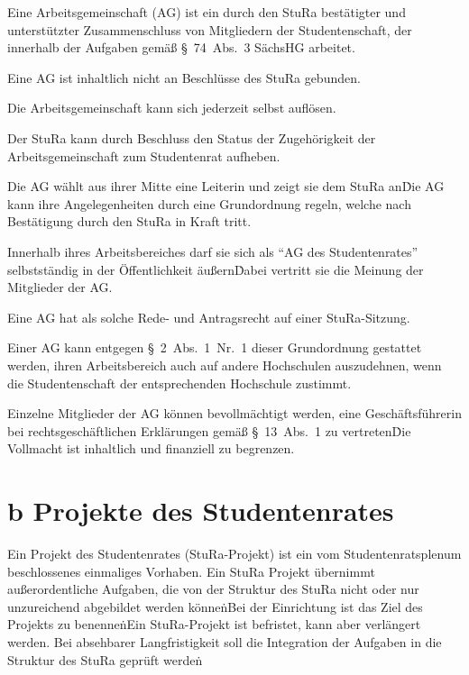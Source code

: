 \begin{multicols}{2}
\Abs \Satz Eine Arbeitsgemeinschaft (AG) ist ein durch den StuRa bestätigter und unterstützter Zusammenschluss von Mitgliedern der Studentenschaft, der innerhalb der Aufgaben gemäß §~74~Abs.~3 SächsHG arbeitet.

\Abs \Satz Eine AG ist inhaltlich nicht an Beschlüsse des StuRa gebunden.

\Abs \Satz Die Arbeitsgemeinschaft kann sich jederzeit selbst auflösen.

\Abs \Satz Der StuRa kann durch Beschluss den Status der Zugehörigkeit der Arbeitsgemeinschaft zum Studentenrat aufheben.

\Abs \Satz Die AG wählt aus ihrer Mitte eine Leiterin und zeigt sie dem StuRa an\. Die AG kann ihre Angelegenheiten durch eine Grundordnung regeln, welche nach Bestätigung durch den StuRa in Kraft tritt.

\Abs \Satz Innerhalb ihres Arbeitsbereiches darf sie sich als "`AG des Studentenrates"' selbstständig in der Öffentlichkeit äußern\. Dabei vertritt sie die Meinung der Mitglieder der AG.

\Abs \Satz Eine AG hat als solche Rede- und Antragsrecht auf einer StuRa-Sitzung.

\Abs \Satz Einer AG kann entgegen §~2~Abs.~1~Nr.~1 dieser Grundordnung gestattet werden, ihren Arbeitsbereich auch auf andere Hochschulen auszudehnen, wenn die Studentenschaft der entsprechenden Hochschule zustimmt.

\Abs \Satz Einzelne Mitglieder der AG können bevollmächtigt werden, eine Geschäftsführerin bei rechtsgeschäftlichen Erklärungen gemäß §~13~Abs.~1 zu vertreten\. Die Vollmacht ist inhaltlich und finanziell zu begrenzen.

\setcounter{section}{27}
\section{b Projekte des Studentenrates}


\Abs \Satz Ein Projekt des Studentenrates (StuRa-Projekt) ist ein vom Studentenratsplenum beschlossenes einmaliges Vorhaben. Ein StuRa Projekt übernimmt außerordentliche Aufgaben, die von der Struktur des StuRa nicht oder nur unzureichend abgebildet werden können\.

\Abs \Satz Bei der Einrichtung ist das Ziel des Projekts zu benennen\.

\Abs \Satz Ein StuRa-Projekt ist befristet, kann aber verlängert werden. Bei absehbarer Langfristigkeit soll die Integration der Aufgaben in die Struktur des StuRa geprüft werden\.


\end{multicols}
